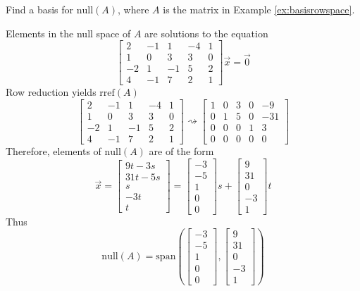 \documentclass{ximera}
\begin{document}
\begin{example}\label{ex:dimnull} Find a basis for $\mbox{null}(A)$, where $A$ is the matrix in Example \ref{ex:basisrowspace}.
\begin{explanation}
Elements in the null space of $A$ are solutions to the equation
$$\begin{bmatrix}2&-1&1&-4&1\\1&0&3&3&0\\-2&1&-1&5&2\\4&-1&7&2&1\end{bmatrix}\vec{x}=\vec{0}$$
Row reduction yields $\mbox{rref}(A)$
$$\begin{bmatrix}2&-1&1&-4&1\\1&0&3&3&0\\-2&1&-1&5&2\\4&-1&7&2&1\end{bmatrix}\rightsquigarrow\begin{bmatrix}1&0&3&0&-9\\0&1&5&0&-31\\0&0&0&1&3\\0&0&0&0&0\end{bmatrix}$$
Therefore, elements of $\mbox{null}(A)$ are of the form
$$\vec{x}=\begin{bmatrix}9t-3s\\31t-5s\\s\\-3t\\t\end{bmatrix}=\begin{bmatrix}-3\\-5\\1\\0\\0\end{bmatrix}s+\begin{bmatrix}9\\31\\0\\-3\\1\end{bmatrix}t$$
Thus
$$\mbox{null}(A)=\mbox{span}\left( \begin{bmatrix}-3\\-5\\1\\0\\0\end{bmatrix}, \begin{bmatrix}9\\31\\0\\-3\\1\end{bmatrix}\right)$$


\end{explanation}
\end{example}
\end{document}
